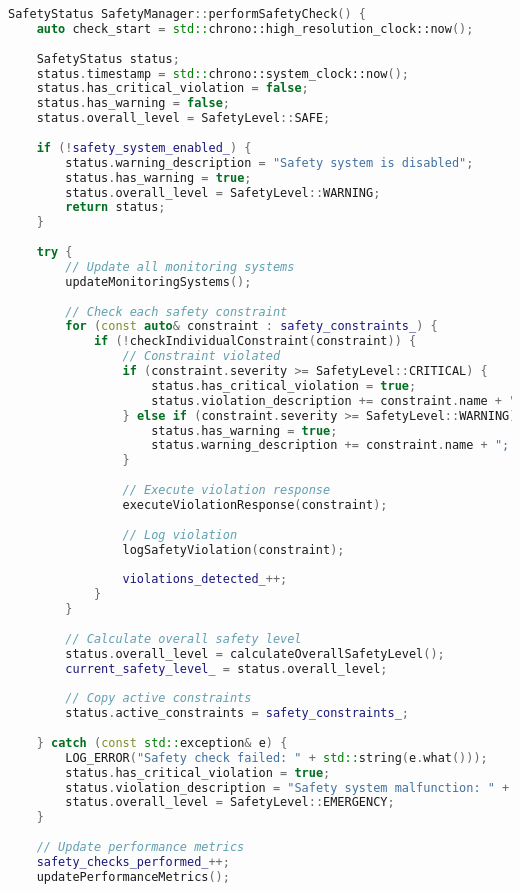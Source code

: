 \begin{lstlisting}[language=C++, caption={Safety Manager Core Implementation}, label={lst:app-safety-manager}]
SafetyStatus SafetyManager::performSafetyCheck() {
    auto check_start = std::chrono::high_resolution_clock::now();
    
    SafetyStatus status;
    status.timestamp = std::chrono::system_clock::now();
    status.has_critical_violation = false;
    status.has_warning = false;
    status.overall_level = SafetyLevel::SAFE;
    
    if (!safety_system_enabled_) {
        status.warning_description = "Safety system is disabled";
        status.has_warning = true;
        status.overall_level = SafetyLevel::WARNING;
        return status;
    }
    
    try {
        // Update all monitoring systems
        updateMonitoringSystems();
        
        // Check each safety constraint
        for (const auto& constraint : safety_constraints_) {
            if (!checkIndividualConstraint(constraint)) {
                // Constraint violated
                if (constraint.severity >= SafetyLevel::CRITICAL) {
                    status.has_critical_violation = true;
                    status.violation_description += constraint.name + "; ";
                } else if (constraint.severity >= SafetyLevel::WARNING) {
                    status.has_warning = true;
                    status.warning_description += constraint.name + "; ";
                }
                
                // Execute violation response
                executeViolationResponse(constraint);
                
                // Log violation
                logSafetyViolation(constraint);
                
                violations_detected_++;
            }
        }
        
        // Calculate overall safety level
        status.overall_level = calculateOverallSafetyLevel();
        current_safety_level_ = status.overall_level;
        
        // Copy active constraints
        status.active_constraints = safety_constraints_;
        
    } catch (const std::exception& e) {
        LOG_ERROR("Safety check failed: " + std::string(e.what()));
        status.has_critical_violation = true;
        status.violation_description = "Safety system malfunction: " + std::string(e.what());
        status.overall_level = SafetyLevel::EMERGENCY;
    }
    
    // Update performance metrics
    safety_checks_performed_++;
    updatePerformanceMetrics();
    

\end{lstlisting}
